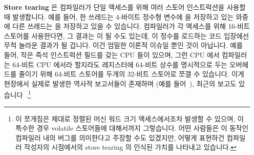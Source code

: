 {\bf Store tearing} 은 컴파일러가 단일 액세스를 위해 여러 스토어 인스트럭션을
사용할 때 발생합니다.
예를 들어, 한 쓰레드는 4-바이트 정수형 변수에  을 저장하고 있는
와중에 다른 쓰레드는  을 저장하고 있을 수 있습니다.
컴파일러가 각 액세스를 위해 16-비트 스토어를 사용한다면, 그 결과는
 이 될 수도 있는데, 이 정수를 로드하는 코드 입장에선 무척 놀라운
결과가 될 겁니다.
이건 엄밀한 이론적 이슈일 뿐인 것이 아닙니다.
예를 들어, 작은 즉석 인스트럭션 필드를 갖는 CPU 들이 있으며, 그런 CPU 에서
컴파일러는 64-비트 CPU 에서라 할지라도 레지스터에 64-비트 상수를 명시적으로
두는 오버헤드를 줄이기 위해 64-비트 스토어를 두개의 32-비트 스토어로 쪼갤 수
있습니다.
이게 현장에서 실제로 발생한 역사적 보고서들이 존재하며 (예를
들어~\cite{KonstantinKhlebnikov2013gccstoretearing}), 최근의 보고도
있습니다~\cite{WillDeacon2019StoreTearingReport}.\footnote{
	이 쪼개짐은 제대로 정렬된 머신 워드 크기 액세스에서조차 발생할 수
	있으며, 이 특수한 경우 volatile 스토어들에 대해서까지 그렇습니다.
	어떤 사람들은 이 동작인 컴파일러 내의 버그를 의미한다고 주장할 수도
	있겠지만, 어떻게 표현하건 컴파일러 작성자의 시점에서의 store tearing 의
	인식된 가치를 나타내고 있습니다.
}

